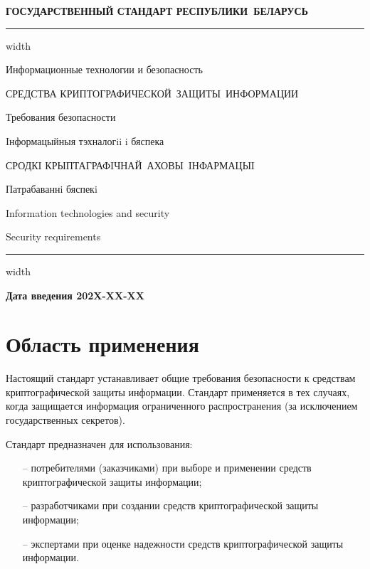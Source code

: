 \newpage
\setcounter{page}{1}
\pagestyle{headings}

\begin{center}
{\bfseries
ГОСУДАРСТВЕННЫЙ СТАНДАРТ РЕСПУБЛИКИ~БЕЛАРУСЬ
\vskip 2pt
\hrule width\textwidth

\vskip 9pt

Информационные технологии и безопасность

СРЕДСТВА КРИПТОГРАФИЧЕСКОЙ~ЗАЩИТЫ~ИНФОРМАЦИИ

Требования безопасности

\vskip 9pt

Iнформацыйныя тэхналогii i бяспека

СРОДКI КРЫПТАГРАФIЧНАЙ~АХОВЫ~IНФАРМАЦЫI

Патрабаваннi бяспекi
}

\vskip 9pt

Information technologies and security


Security requirements

\vskip 4pt                
\hrule width \textwidth
\end{center}

\mbox{}\hfill{\bfseries Дата введения 202X-XX-XX}

\chapter{Область применения}\label{SCOPE}

Настоящий стандарт устанавливает общие требования безопасности к средствам
криптографической защиты информации. Стандарт применяется в тех 
случаях, когда защищается информация ограниченного распространения (за 
исключением государственных секретов).

Стандарт предназначен для использования:
\begin{itemize}
\item[--]
потребителями (заказчиками) при выборе и применении средств криптографической
защиты информации;

\item[--]
разработчиками при создании средств криптографической защиты информации;

\item[--]
экспертами при оценке надежности средств криптографической защиты 
информации. 
\end{itemize}


